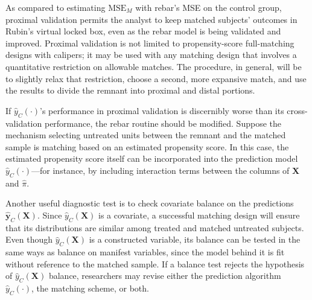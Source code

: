 \documentclass[12pt]{article}\usepackage[]{graphicx}\usepackage[]{color}
\newcommand{\Match}{M}
\newcommand{\algorithm}{\hat{y}_C(\cdot)}
\newcommand{\covMat}{\bm{X}}
\begin{document}
As compared to estimating $\mathrm{MSE}_{\Match}$ with rebar's MSE on
the control group, proximal validation permits the analyst to keep matched
subjects' outcomes in Rubin's \citeyearpar{rubin2008objective} virtual
locked box, even as the rebar model is being validated and improved.
Proximal validation is not limited to propensity-score full-matching designs with calipers; it may be used with any matching design that involves a quantitative restriction on allowable matches.
The procedure, in general, will be to slightly relax that restriction, choose a second, more expansive match, and use the results to divide the remnant into proximal and distal portions.

If $\algorithm$'s performance in proximal validation is discernibly
worse than its cross-validation performance, the rebar routine should be modified.
Suppose the mechanism selecting untreated units between the remnant and
the matched sample is matching based on an estimated propensity score.
In this case, the estimated propensity score itself can be incorporated into
the prediction model $\algorithm$---for instance, by including interaction terms
between the columns of $\covMat$ and $\hat{\pi}$.

Another useful diagnostic test is to check covariate balance on the predictions $\bm{\hat{y}}_C(\covMat)$.
Since $\hat{y}_C(\covMat)$ is a covariate, a successful matching
design will ensure that its distributions are similar among treated
and matched untreated subjects.  Even though $\hat{y}_C(\covMat)$ is a
constructed variable, its balance can be tested in the
same ways as balance on manifest variables, since the model behind it is fit without
reference to the matched sample.
If a balance test rejects the hypothesis of $\hat{y}_C(\covMat)$ balance, researchers may revise either the prediction algorithm $\algorithm$, the matching scheme, or both.
\end{document}
